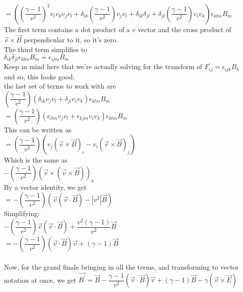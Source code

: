 \documentclass[prb,preprint]
{revtex4-1}
\begin{document}
\\
$= \left(\left(\dfrac{\gamma - 1}{v^2}\right)^2v_i v_k v_j v_l + \delta_{ik} \left(\dfrac{\gamma - 1}{v^2}\right) v_j v_l + \delta_{ik}\delta_{jl} + \delta_{jl} \left(\dfrac{\gamma - 1}{v^2}\right) v_i v_k \right)\epsilon_{klm}B_m$
\\
The first term contains a dot product of a $v$ vector and the cross product of $\vec{v} \times \vec{B}$ perpendicular to it, so it's zero.
\\
The third term simplifies to 
\\
$\delta_{ik}\delta_{jl}\epsilon_{klm} B_m = \epsilon_{ijm}B_m$
\\
Keep in mind here that we're actually solving for the transform of $F^\prime_{ij} = \epsilon_{ijk} B_k$ and so, this looks good.
\\
the last set of terms to work with are 
\\
$\left(\dfrac{\gamma - 1}{v^2}\right) \left(\delta_{ik}v_j v_l + \delta_{jl} v_i v_k\right) \epsilon_{klm} B_m$
\\
$= \left(\dfrac{\gamma - 1}{v^2}\right) \left(\epsilon_{ilm}v_j v_l + \epsilon_{kjm} v_i v_k\right) \epsilon_{klm} B_m$
\\
This can be written as 
\\
$= \left(\dfrac{\gamma - 1}{v^2}\right)\left(v_j\left(\vec{v} \times \vec{B}\right)_i - v_i \left(\vec{v} \times \vec{B}\right)_j\right)$
\\
Which is the same as 
\\
$-\left(\dfrac{\gamma - 1}{v^2}\right)\left(\vec{v} \times \left(\vec{v} \times \vec{B} \right) \right)_k$
\\
By a vector identity, we get
\\
$= -\left(\dfrac{\gamma - 1}{v^2}\right)\left(\vec{v}\left(\vec{v} \cdot \vec{B} \right) - |v^2| \vec{B}\right)$
\\
Simplifying:
\\
$-\left(\dfrac{\gamma - 1}{v^2}\right) \vec{v}\left(\vec{v} \cdot \vec{B} \right) + \dfrac{v^2\left(\gamma - 1\right)}{v^2} \vec{B}$
\\
$=-\left(\dfrac{\gamma - 1}{v^2}\right) \left(\vec{v} \cdot \vec{B} \right)\vec{v} + \left(\gamma - 1\right) \vec{B}$
\\
\\
Now, for the grand finale bringing in all the terms, and transforming to vector notation at once, we get
$\vec{B^\prime} = \vec{B} - \dfrac{\gamma - 1}{v^2}\left(\vec{v} \cdot \vec{B}\right)\vec{v} + \left(\gamma - 1\right)\vec{B} - \gamma \left(\vec{v} \times \vec{E}\right)$
\end{document}
